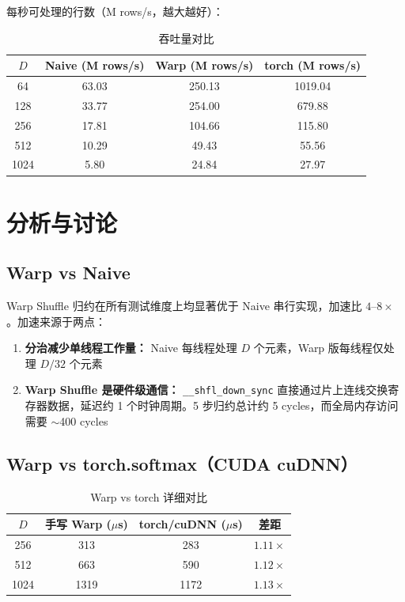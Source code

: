 \documentclass[12pt,a4paper]{ctexart}
\begin{document}
每秒可处理的行数（M rows/s，越大越好）：

\begin{table}[H]
\centering
\caption{吞吐量对比}
\begin{tabular}{cccc}
\toprule
$D$ & Naive (M rows/s) & Warp (M rows/s) & torch (M rows/s) \\
\midrule
64   & 63.03  & 250.13 & 1019.04 \\
128  & 33.77  & 254.00 & 679.88  \\
256  & 17.81  & 104.66 & 115.80  \\
512  & 10.29  & 49.43  & 55.56   \\
1024 & 5.80   & 24.84  & 27.97   \\
\bottomrule
\end{tabular}
\end{table}

\section{分析与讨论}

\subsection{Warp vs Naive}

Warp Shuffle 归约在所有测试维度上均显著优于 Naive 串行实现，加速比 $4$--$8\times$。加速来源于两点：

\begin{enumerate}[itemsep=4pt]
    \item \textbf{分治减少单线程工作量：} Naive 每线程处理 $D$ 个元素，Warp 版每线程仅处理 $D/32$ 个元素
    \item \textbf{Warp Shuffle 是硬件级通信：} \texttt{\_\_shfl\_down\_sync} 直接通过片上连线交换寄存器数据，延迟约 1 个时钟周期。5 步归约总计约 5 cycles，而全局内存访问需要 $\sim$400 cycles
\end{enumerate}

\subsection{Warp vs torch.softmax（CUDA cuDNN）}

\begin{table}[H]
\centering
\caption{Warp vs torch 详细对比}
\begin{tabular}{cccc}
\toprule
$D$ & 手写 Warp ($\mu$s) & torch/cuDNN ($\mu$s) & 差距 \\
\midrule
256  & 313  & 283  & $1.11\times$ \\
512  & 663  & 590  & $1.12\times$ \\
1024 & 1319 & 1172 & $1.13\times$ \\
\bottomrule
\end{tabular}
\end{table}
\end{document}
